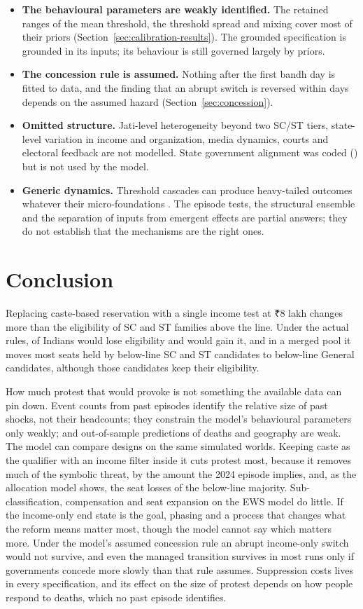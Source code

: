 \documentclass[11pt,a4paper]{article}
\newcommand{\rupee}{{\rupeefont ₹}}
\begin{document}
\begin{itemize}
\item \textbf{The behavioural parameters are weakly identified.} The retained ranges of the mean threshold, the threshold spread and mixing cover most of their priors (Section~\ref{sec:calibration-results}). The grounded specification is grounded in its inputs; its behaviour is still governed largely by priors.
\item \textbf{The concession rule is assumed.} Nothing after the first bandh day is fitted to data, and the finding that an abrupt switch is reversed within days depends on the assumed hazard (Section~\ref{sec:concession}).
\item \textbf{Omitted structure.} Jati-level heterogeneity beyond two SC/ST tiers, state-level variation in income and organization, media dynamics, courts and electoral feedback are not modelled. State government alignment was coded () but is not used by the model.
\item \textbf{Generic dynamics.} Threshold cascades can produce heavy-tailed outcomes whatever their micro-foundations \citep{thron2015}. The episode tests, the structural ensemble and the separation of inputs from emergent effects are partial answers; they do not establish that the mechanisms are the right ones.
\end{itemize}

\section{Conclusion}
\label{sec:conclusion}
Replacing caste-based reservation with a single income test at \rupee8 lakh changes more than the eligibility of SC and ST families above the line. Under the actual rules, \EligibilityLose{} of Indians would lose eligibility and \EligibilityGain{} would gain it, and in a merged pool it moves most seats held by below-line SC and ST candidates to below-line General candidates, although those candidates keep their eligibility.

How much protest that would provoke is not something the available data can pin down. Event counts from past episodes identify the relative size of past shocks, not their headcounts; they constrain the model's behavioural parameters only weakly; and out-of-sample predictions of deaths and geography are weak. The model can compare designs on the same simulated worlds. Keeping caste as the qualifier with an income filter inside it cuts protest most, because it removes much of the symbolic threat, by the amount the 2024 episode implies, and, as the allocation model shows, the seat losses of the below-line majority. Sub-classification, compensation and seat expansion on the EWS model do little. If the income-only end state is the goal, phasing and a process that changes what the reform means matter most, though the model cannot say which matters more. Under the model's assumed concession rule an abrupt income-only switch would not survive, and even the managed transition survives in most runs only if governments concede more slowly than that rule assumes. Suppression costs lives in every specification, and its effect on the size of protest depends on how people respond to deaths, which no past episode identifies.
\end{document}
